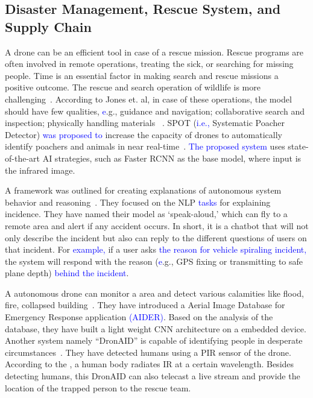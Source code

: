 \subsection{Disaster Management, Rescue System, and Supply Chain}
A drone can be an efficient tool in case of a rescue mission. Rescue programs are often involved in remote operations, treating the sick, or searching for missing people. Time is an essential factor in making search and rescue missions a positive outcome.  The rescue and search operation of wildlife is more challenging~\cite{mayer2019drones}. According to  Jones et. al, in case of these operations, the model should have few qualities, \textcolor{blue}{e}.g., guidance and navigation; collaborative search and inspection; physically handling materials ~\cite{brennan2019drones}.
SPOT (\textcolor{blue}{i.e.,} Systematic Poacher Detector) \textcolor{blue}{was proposed to}  increase the capacity of drones to automatically identify poachers and animals in near real-time~\cite{bondi2018spot}.  \textcolor{blue}{The proposed system} uses state-of-the-art AI strategies, such as Faster RCNN as the base model, where input is the infrared image.

A framework  was outlined for creating explanations of autonomous system behavior and reasoning~\cite{garcia2018explainable}. They focused on the NLP \textcolor{blue}{tasks} for explaining incidence. They have named their model as `speak-aloud,' which can fly to a remote area and alert if any accident occurs. In short, it is a chatbot that will not only describe the incident but also can reply to the different questions of users on that incident. For \textcolor{blue}{example,}  if a user asks \textcolor{blue}{the reason for vehicle spiraling incident,}  the system will respond with the reason  (\textcolor{blue}{e}.g., GPS fixing or transmitting to safe plane depth) \textcolor{blue}{behind the incident}.

A autonomous drone can monitor a area and detect various calamities like flood, fire, collapsed building~\cite{kyrkou2019deep}. They have introduced a Aerial Image Database for Emergency Response application  \textcolor{blue}{(AIDER)}. Based on the analysis of the database, they have built a light weight CNN architecture on a embedded device.
Another system namely ``DronAID'' is capable of identifying people in desperate circumstances~\cite{tariq2018dronaid}. They have detected humans using a PIR sensor of the drone. According to the \cite{jin2011target}, a human body radiates IR at a certain wavelength. Besides detecting humans, this DronAID can also telecast a live stream and provide the location of the trapped person to the rescue team. 

